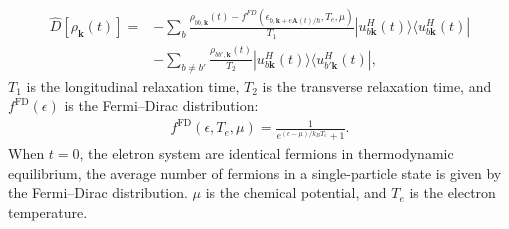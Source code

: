 \begin{align}
	\hat D\left [\rho_{\mathbf k}(t) \right ]= & -\sum_{b}\frac{\rho_{bb,\mathbf k}(t)-f^{FD}\left
	(\epsilon_{b,\mathbf k+e\mathbf A(t)/\hbar},T_e,\mu \right)}{T_1}|u^H_{b\mathbf k}(t)\rangle \langle
	u^H_{b\mathbf k}(t)|                                                                                                                                        \\
	                                           & -\sum_{b\neq b'} \frac{\rho_{bb',\mathbf k}(t)}{T_2}|u^H_{b\mathbf k}(t)\rangle \langle u^H_{b'\mathbf k}(t)|,
	\label{eqn:relaxation}
\end{align}
$T_1$ is the longitudinal relaxation time, $T_2$ is the transverse relaxation time, and
$f^{\mathrm{FD}}(\epsilon)$ is the Fermi--Dirac distribution:
\begin{align}
	f^{\mathrm{FD}}(\epsilon, T_e, \mu)=\frac{1}{e^{(\epsilon-\mu)/k_BT_e}+1}.
	\label{eq:fd-dist}
\end{align}
When $t=0$, the eletron system are identical fermions in thermodynamic equilibrium, the average number of fermions in a single-particle state is given by the Fermi–Dirac distribution. $\mu$ is the chemical potential, and $T_e$ is the electron temperature.

